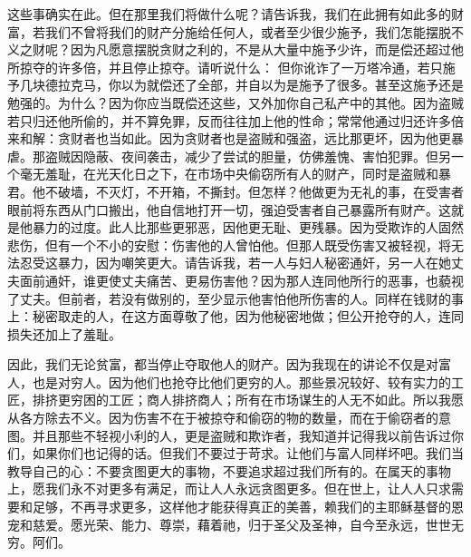 这些事确实在此。但在那里我们将做什么呢？请告诉我，我们在此拥有如此多的财富，若我们不曾将我们的财产分施给任何人，或者至少很少施予，我们怎能摆脱不义之财呢？因为凡愿意摆脱贪财之利的，不是从大量中施予少许，而是偿还超过他所掠夺的许多倍，并且停止掠夺。请听说什么： 但你讹诈了一万塔冷通，若只施予几块德拉克马，你以为就偿还了全部，并自以为是施予了很多。甚至这施予还是勉强的。为什么？因为你应当既偿还这些，又外加你自己私产中的其他。因为盗贼若只归还他所偷的，并不算免罪，反而往往加上他的性命；常常他通过归还许多倍来和解：贪财者也当如此。因为贪财者也是盗贼和强盗，远比那更坏，因为他更暴虐。那盗贼因隐蔽、夜间袭击，减少了尝试的胆量，仿佛羞愧、害怕犯罪。但另一个毫无羞耻，在光天化日之下，在市场中央偷窃所有人的财产，同时是盗贼和暴君。他不破墙，不灭灯，不开箱，不撕封。但怎样？他做更为无礼的事，在受害者眼前将东西从门口搬出，他自信地打开一切，强迫受害者自己暴露所有财产。这就是他暴力的过度。此人比那些更邪恶，因他更无耻、更残暴。因为受欺诈的人固然悲伤，但有一个不小的安慰：伤害他的人曾怕他。但那人既受伤害又被轻视，将无法忍受这暴力，因为嘲笑更大。请告诉我，若一人与妇人秘密通奸，另一人在她丈夫面前通奸，谁更使丈夫痛苦、更易伤害他？因为那人连同他所行的恶事，也藐视了丈夫。但前者，若没有做别的，至少显示他害怕他所伤害的人。同样在钱财的事上：秘密取走的人，在这方面尊敬了他，因为他秘密地做；但公开抢夺的人，连同损失还加上了羞耻。\par

因此，我们无论贫富，都当停止夺取他人的财产。因为我现在的讲论不仅是对富人，也是对穷人。因为他们也抢夺比他们更穷的人。那些景况较好、较有实力的工匠，排挤更穷困的工匠；商人排挤商人；所有在市场谋生的人无不如此。所以我愿从各方除去不义。因为伤害不在于被掠夺和偷窃的物的数量，而在于偷窃者的意图。并且那些不轻视小利的人，更是盗贼和欺诈者，我知道并记得我以前告诉过你们，如果你们也记得的话。但我们不要过于苛求。让他们与富人同样坏吧。我们当教导自己的心：不要贪图更大的事物，不要追求超过我们所有的。在属天的事物上，愿我们永不对更多有满足，而让人人永远贪图更多。但在世上，让人人只求需要和足够，不再寻求更多，这样他才能获得真正的美善，赖我们的主耶稣基督的恩宠和慈爱。愿光荣、能力、尊崇，藉着祂，归于圣父及圣神，自今至永远，世世无穷。阿们。\par



